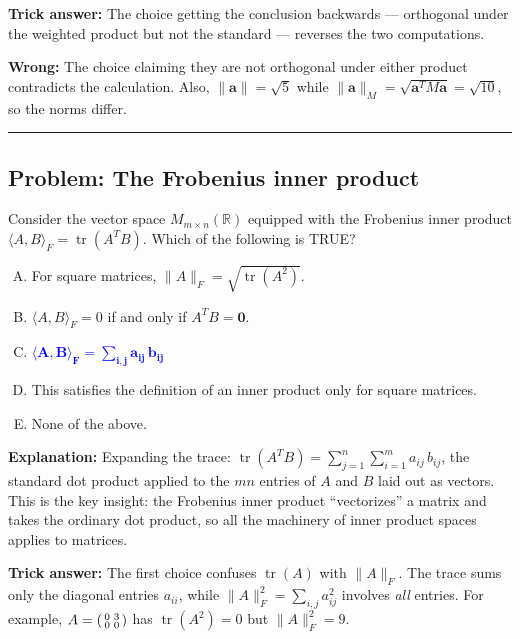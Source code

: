 \documentclass[12pt]{amsart}
\newcommand{\divider}{
  \vspace{-1em}
  \noindent
  \raisebox{-0.15ex}{\textbullet}%
  \hspace{0.5em}%
  \rule[0.5ex]{0.95\textwidth}{1.0pt}%
  \hspace{0.5em}%
  \raisebox{-0.15ex}{\textbullet}%
  \vspace{0em}
}
\begin{document}
\textbf{Trick answer:}
The choice getting the conclusion backwards --- orthogonal under the weighted
product but not the standard --- reverses the two computations.

\textbf{Wrong:}
The choice claiming they are not orthogonal under either product contradicts the
calculation.
Also, $\|\mathbf{a}\| = \sqrt{5}$ while $\|\mathbf{a}\|_M = \sqrt{\mathbf{a}^TM\mathbf{a}} = \sqrt{10}$,
so the norms differ.

\divider

\subsection*{Problem: The Frobenius inner product}

Consider the vector space $M_{m\times n}(\mathbb{R})$ equipped with the Frobenius
inner product $\langle A, B \rangle_F = \operatorname{tr}(A^T B)$.
Which of the following is TRUE?

\begin{enumerate}[(A)]
\item For square matrices, $\|A\|_F = \sqrt{\operatorname{tr}(A^2)}$.
\item $\langle A, B \rangle_F = 0$ if and only if $A^T B = \mathbf{0}$.
\item \textcolor{blue}{$\boldsymbol{\langle A, B \rangle_F = \sum_{i,j} a_{ij}\,b_{ij}}$}
\item This satisfies the definition of an inner product only for square matrices.
\item None of the above.
\end{enumerate}

\textbf{Explanation:}
Expanding the trace:
$\operatorname{tr}(A^T B) = \sum_{j=1}^{n}\sum_{i=1}^{m}a_{ij}\,b_{ij}$,
the standard dot product applied to the $mn$ entries of $A$ and $B$ laid out
as vectors.
This is the key insight: the Frobenius inner product ``vectorizes'' a matrix
and takes the ordinary dot product, so all the machinery of inner product
spaces applies to matrices.

\textbf{Trick answer:}
The first choice confuses $\operatorname{tr}(A)$ with $\|A\|_F$.
The trace sums only the diagonal entries $a_{ii}$, while
$\|A\|_F^2 = \sum_{i,j}a_{ij}^2$ involves \emph{all} entries.
For example, $A = \begin{psmallmatrix}0&3\\0&0\end{psmallmatrix}$
has $\operatorname{tr}(A^2) = 0$ but $\|A\|_F^2 = 9$.
\end{document}
